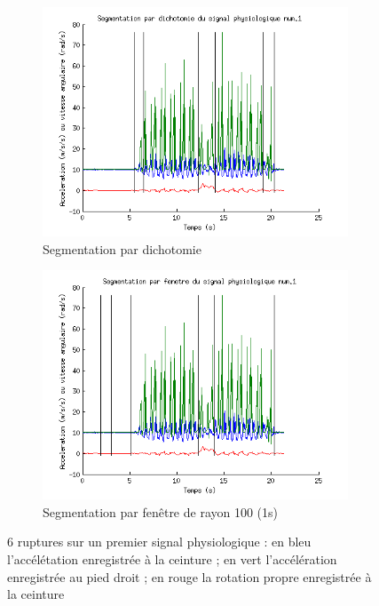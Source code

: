 \documentclass[french,11pt,notitlepage]{report}
\begin{document}
	\begin{figure}[hp]
		\begin{subfigure}[t]{.49\textwidth}
		  \includegraphics[width=\linewidth,height=.25\textheight]{phys1_dikt}
			\caption{Segmentation par dichotomie}
			\label{}
		\end{subfigure}
		\hfill
		\begin{subfigure}[t]{.49\textwidth}
			\includegraphics[width=\linewidth,height=.25\textheight]{phys1_mid}
			\caption{Segmentation par fenêtre de rayon 100 (1s)}
			\label{}
		\end{subfigure}
	\caption{6 ruptures sur un premier signal physiologique : en bleu l'accélétation enregistrée à la ceinture ; en vert l'accélération enregistrée au pied droit ; en rouge la rotation propre enregistrée à la ceinture}
	\label{score_min}
	\end{figure}
	
\end{document}
